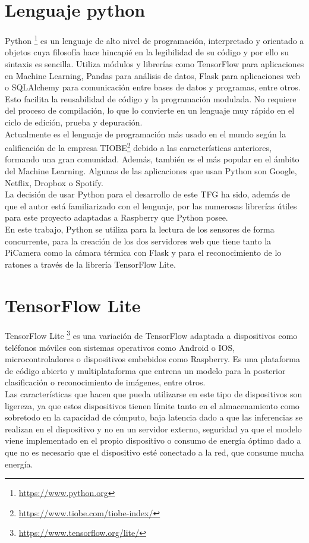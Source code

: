 \section{Lenguaje python}
\label{sec:python}
Python \footnote{\url{https://www.python.org}} es un lenguaje de alto nivel de programación, interpretado y orientado a objetos cuya filosofía hace hincapié en la legibilidad de su código y por ello su sintaxis es sencilla. Utiliza módulos y librerías como TensorFlow para aplicaciones en Machine Learning, Pandas para análisis de datos, Flask para aplicaciones web o SQLAlchemy para comunicación entre bases de datos y programas, entre otros. Esto facilita la reusabilidad de código y la programación modulada. No requiere del proceso de compilación, lo que lo convierte en un lenguaje muy rápido en el ciclo de edición, prueba y depuración.\\
Actualmente es el lenguaje de programación más usado en el mundo según la calificación de la empresa TIOBE\footnote{\url{https://www.tiobe.com/tiobe-index/}} debido a las características anteriores, formando una gran comunidad. Además, también es el más popular en el ámbito del Machine Learning. Algunas de las aplicaciones que usan Python son Google, Netflix, Dropbox o Spotify.\\

La decisión de usar Python para el desarrollo de este TFG ha sido, además de que el autor está familiarizado con el lenguaje, por las numerosas librerías útiles para este proyecto adaptadas a Raspberry que Python posee.\\
En este trabajo, Python se utiliza para la lectura de los sensores de forma concurrente, para la creación de los dos servidores web que tiene tanto la PiCamera como la cámara térmica con Flask y para el reconocimiento de lo ratones a través de la librería TensorFlow Lite.\\

\section{TensorFlow Lite}
\label{sec:tensor}
TensorFlow Lite \footnote{\url{https://www.tensorflow.org/lite/}} es una variación de TensorFlow adaptada a dispositivos como teléfonos móviles con sistemas operativos como Android o IOS, microcontroladores o dispositivos embebidos como Raspberry. Es una plataforma de código abierto y multiplataforma que entrena un modelo para la posterior clasificación o reconocimiento de imágenes, entre otros.\\
Las características que hacen que pueda utilizarse en este tipo de dispositivos son ligereza, ya que estos dispositivos tienen límite tanto en el almacenamiento como sobretodo en la capacidad de cómputo, baja latencia dado a que las inferencias se realizan en el dispositivo y no en un servidor externo, seguridad ya que el modelo viene implementado en el propio dispositivo o consumo de energía óptimo dado a que no es necesario que el dispositivo esté conectado a la red, que consume mucha energía.\\

